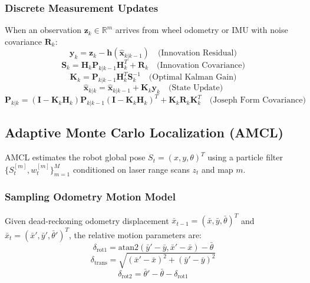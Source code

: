 \documentclass[10pt,a4paper]{article}
\begin{document}
\subsubsection{Discrete Measurement Updates}
When an observation $\mathbf{z}_k \in \mathbb{R}^m$ arrives from wheel odometry or IMU with noise covariance $\mathbf{R}_k$:
\begin{equation}
\mathbf{y}_k = \mathbf{z}_k - \mathbf{h}(\hat{\mathbf{x}}_{k|k-1}) \quad \text{(Innovation Residual)}
\end{equation}
\begin{equation}
\mathbf{S}_k = \mathbf{H}_k \mathbf{P}_{k|k-1} \mathbf{H}_k^T + \mathbf{R}_k \quad \text{(Innovation Covariance)}
\end{equation}
\begin{equation}
\mathbf{K}_k = \mathbf{P}_{k|k-1} \mathbf{H}_k^T \mathbf{S}_k^{-1} \quad \text{(Optimal Kalman Gain)}
\end{equation}
\begin{equation}
\hat{\mathbf{x}}_{k|k} = \hat{\mathbf{x}}_{k|k-1} + \mathbf{K}_k \mathbf{y}_k \quad \text{(State Update)}
\end{equation}
\begin{equation}
\mathbf{P}_{k|k} = (\mathbf{I} - \mathbf{K}_k \mathbf{H}_k) \mathbf{P}_{k|k-1} (\mathbf{I} - \mathbf{K}_k \mathbf{H}_k)^T + \mathbf{K}_k \mathbf{R}_k \mathbf{K}_k^T \quad \text{(Joseph Form Covariance)}
\end{equation}

\subsection{Adaptive Monte Carlo Localization (AMCL)}
AMCL estimates the robot global pose $S_t = (x, y, \theta)^T$ using a particle filter $\{S_t^{[m]}, w_t^{[m]}\}_{m=1}^M$ conditioned on laser range scans $z_t$ and map $m$.

\subsubsection{Sampling Odometry Motion Model}
Given dead-reckoning odometry displacement $\bar{x}_{t-1} = (\bar{x}, \bar{y}, \bar{\theta})^T$ and $\bar{x}_t = (\bar{x}', \bar{y}', \bar{\theta}')^T$, the relative motion parameters are:
\begin{equation}
\delta_{\text{rot1}} = \text{atan2}(\bar{y}' - \bar{y}, \bar{x}' - \bar{x}) - \bar{\theta}
\end{equation}
\begin{equation}
\delta_{\text{trans}} = \sqrt{(\bar{x}' - \bar{x})^2 + (\bar{y}' - \bar{y})^2}
\end{equation}
\begin{equation}
\delta_{\text{rot2}} = \bar{\theta}' - \bar{\theta} - \delta_{\text{rot1}}
\end{equation}
\end{document}
